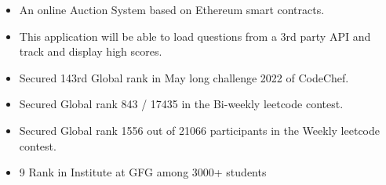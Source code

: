 \documentclass[10pt,a4paper,ragged2e]{altacv}
\begin{document}
\divider

\begin{itemize}
\item An online Auction System based on Ethereum smart contracts.
\end{itemize}

\divider

\begin{itemize}
\item This application will be able to load questions from a 3rd party API and track and display high scores.
\end{itemize}

\divider


%



\begin{itemize}
    \item Secured 143rd Global rank in May long challenge 2022 of CodeChef.
    \item Secured Global rank 843 / 17435 in the Bi-weekly leetcode contest.
    \item Secured Global rank 1556 out of 21066 participants in the Weekly leetcode contest.
    \item 9 Rank in Institute at GFG among 3000+ students
\end{itemize}
\end{document}
